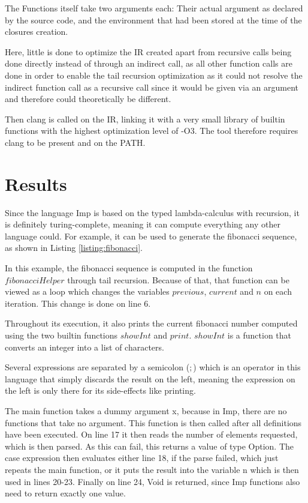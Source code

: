 \documentclass[12pt]{article}
\newcommand{\importListing}[1]{
    \begin{minipage}{\linewidth}
    
    \end{minipage}
}
\begin{document}
The Functions itself take two arguments each: Their actual argument
as declared by the source code, and the environment that had been stored
at the time of the closures creation.

Here, little is done to optimize the IR created apart
from recursive calls being done directly instead of through an indirect
call, as all other function calls are done in order to enable
the tail recursion optimization as it could not resolve the indirect function call
as a recursive call since it would be given via an argument and therefore
could theoretically be different.

Then clang is called on the IR, linking it with a very small library of builtin
functions with the highest optimization level of -O3. The tool therefore requires
clang to be present and on the PATH.

\section{Results}
Since the language Imp is based on the typed lambda-calculus with recursion,
it is definitely turing-complete, meaning it can compute everything any other
language could. For example, it can be used to generate the fibonacci sequence,
as shown in Listing \ref{listing:fibonacci}.

\importListing{code/fibonacci.tex}

In this example, the fibonacci sequence is computed in the function
$fibonacciHelper$ through tail recursion. Because of that, that function
can be viewed as a loop which changes the variables $previous$, $current$ and
$n$ on each iteration. This change is done on line 6.

Throughout its execution, it also prints the current fibonacci number
computed using the two builtin functions $showInt$ and $print$.
$showInt$ is a function that converts an integer into a list of characters.

Several expressions are separated by a semicolon ($;$) which is an operator
in this language that simply discards the result on the left, meaning
the expression on the left is only there for its side-effects like printing.

The main function takes a dummy argument x, because in Imp, there are no
functions that take no argument. This function is then called
after all definitions have been executed.
On line 17 it then reads the number of elements requested,
which is then parsed. As this can fail, this returns a
value of type Option. The case expression then evaluates either line
18, if the parse failed, which just repeats the main function,
or it puts the result into the variable n which is then used in
lines 20-23. Finally on line 24, Void is returned, since Imp functions
also need to return exactly one value.
\end{document}
